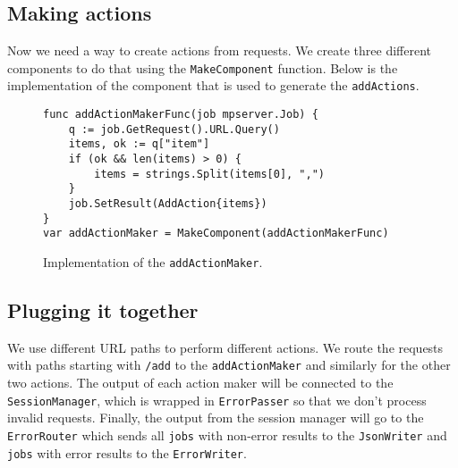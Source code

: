 \subsection{Making actions}
Now we need a way to create actions from requests. We create three different
components to do that using the \texttt{MakeComponent} function. Below
is the implementation of the component that is used to generate 
the \texttt{addActions}.
\begin{figure}[h]
\begin{lstlisting}
func addActionMakerFunc(job mpserver.Job) {
    q := job.GetRequest().URL.Query()
    items, ok := q["item"]
    if (ok && len(items) > 0) {
        items = strings.Split(items[0], ",")
    }
    job.SetResult(AddAction{items})
}
var addActionMaker = MakeComponent(addActionMakerFunc) 
\end{lstlisting}
\caption[scale=1.0]{Implementation of the \texttt{addActionMaker}.}
\label{fig:addActionMaker}
\end{figure}

\subsection{Plugging it together}
We use different URL paths to perform different actions. We route the 
requests with paths starting with \texttt{/add} to the \texttt{addActionMaker}
and similarly for the other two actions. The output of each action maker
will be connected to the \texttt{SessionManager}, which is wrapped in
\texttt{ErrorPasser} so that we don't process invalid requests.
Finally, the output from the session manager will go to the \texttt{ErrorRouter}
which sends all \texttt{jobs} with non-error results to the 
\texttt{JsonWriter} and \texttt{jobs} with error results to the 
\texttt{ErrorWriter}. 


